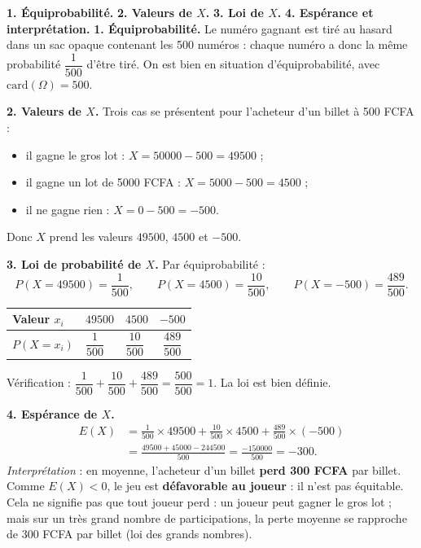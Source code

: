 \documentclass[11pt]{article}
\begin{document}
\begin{exoresolu}
\textbf{1. Équiprobabilité.} \textbf{2. Valeurs de $X$.} \textbf{3. Loi de $X$.} \textbf{4. Espérance et interprétation.}
\tcblower
\textbf{1. Équiprobabilité.} Le numéro gagnant est tiré au hasard dans un sac opaque contenant les 500 numéros : chaque numéro a donc la même probabilité $\dfrac{1}{500}$ d'être tiré. On est bien en situation d'équiprobabilité, avec $\text{card}(\Omega) = 500$.

\textbf{2. Valeurs de $X$.} Trois cas se présentent pour l'acheteur d'un billet à 500 FCFA :
\begin{itemize}
\item il gagne le gros lot : $X = \num{50000} - 500 = \num{49500}$ ;
\item il gagne un lot de \num{5000} FCFA : $X = \num{5000} - 500 = \num{4500}$ ;
\item il ne gagne rien : $X = 0 - 500 = -500$.
\end{itemize}
Donc $X$ prend les valeurs $\num{49500}$, $\num{4500}$ et $-500$.

\textbf{3. Loi de probabilité de $X$.} Par équiprobabilité :
\[
P(X = \num{49500}) = \frac{1}{500}, \qquad P(X = \num{4500}) = \frac{10}{500}, \qquad P(X = -500) = \frac{489}{500}.
\]
\begin{center}
\begin{tabularx}{\linewidth}{|l|X|X|X|}
\hline
\rowcolor{popblueL} Valeur $x_i$ & \centering $\num{49500}$ & \centering $\num{4500}$ & \multicolumn{1}{c|}{$-500$} \\
\hline
$P(X = x_i)$ & \centering $\dfrac{1}{500}$ & \centering $\dfrac{10}{500}$ & \multicolumn{1}{c|}{$\dfrac{489}{500}$} \\
\hline
\end{tabularx}
\end{center}
Vérification : $\dfrac{1}{500} + \dfrac{10}{500} + \dfrac{489}{500} = \dfrac{500}{500} = 1$. La loi est bien définie.

\textbf{4. Espérance de $X$.}
\begin{align*}
E(X) &= \frac{1}{500}\times \num{49500} + \frac{10}{500}\times \num{4500} + \frac{489}{500}\times(-500)\\
&= \frac{\num{49500} + \num{45000} - \num{244500}}{500} = \frac{-\num{150000}}{500} = -300.
\end{align*}
\emph{Interprétation} : en moyenne, l'acheteur d'un billet \textbf{perd 300 FCFA} par billet. Comme $E(X) < 0$, le jeu est \textbf{défavorable au joueur} : il n'est pas équitable. Cela ne signifie pas que tout joueur perd : un joueur peut gagner le gros lot ; mais sur un très grand nombre de participations, la perte moyenne se rapproche de 300 FCFA par billet (loi des grands nombres).
\end{exoresolu}
\end{document}
